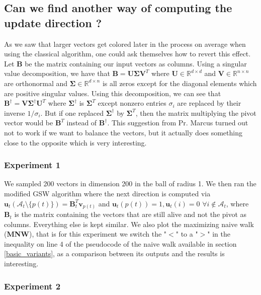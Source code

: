 \documentclass[12pt]{article}
\begin{document}
\subsection{Can we find another way of computing the update direction ?}
 As we saw that larger vectors get colored later in the process on average when using the classical algorithm, one could ask themselves how to revert this effect. Let $\textbf{B}$ be the matrix containing our input vectors as columns. Using a singular value decomposition, we have that $\textbf{B}=\textbf{U}\bm{\Sigma}\textbf{V}^T$ where $\textbf{U}\in\mathbb{R}^{d\times d}$ and $\textbf{V}\in\mathbb{R}^{n\times n}$ are orthonormal and $\bm{\Sigma}\in\mathbb{R}^{d\times n}$ is all zeros except for the diagonal elements which are positive singular values. Using this decomposition, we can see that $\textbf{B}^\dagger=\textbf{V}\bm{\Sigma}^\dagger\textbf{U}^T$ where $\bm{\Sigma}^\dagger$ is $\bm{\Sigma}^T$ except nonzero entries $\sigma_i$ are replaced by their inverse $1/\sigma_i$. But if one replaced $\bm{\Sigma}^\dagger$ by $\bm{\Sigma}^T$, then the matrix multiplying the pivot vector would be $\textbf{B}^T$ instead of $\textbf{B}^\dagger$. This suggestion from Pr. Marcus turned out not to work if we want to balance the vectors, but it actually does something close to the opposite which is very interesting. 

\subsubsection{Experiment 1}\label{exp1_A_T}

We sampled 200 vectors in dimension 200 in the ball of radius 1. We then ran the modified GSW algorithm where the next direction is computed via $\textbf{u}_t(\mathcal{A}_t\setminus\{p(t)\})=\textbf{B}_t^T\textbf{v}_{p(t)}$ and $\textbf{u}_t(p(t))=1, \textbf{u}_t(i)=0$ $\forall i\not\in\mathcal{A}_t$, where $\textbf{B}_t$ is the matrix containing the vectors that are still alive and not the pivot as columns. Everything else is kept similar. We also plot the maximizing naive walk (\textbf{MNW}), that is for this experiment we switch the "$<$" to a "$>$" in the inequality on line 4 of the pseudocode of the naive walk available in section \ref{basic_variants}, as a comparison between its outputs and the results is interesting.

\subsubsection{Experiment 2}\label{exp2_A_T}
\end{document}
